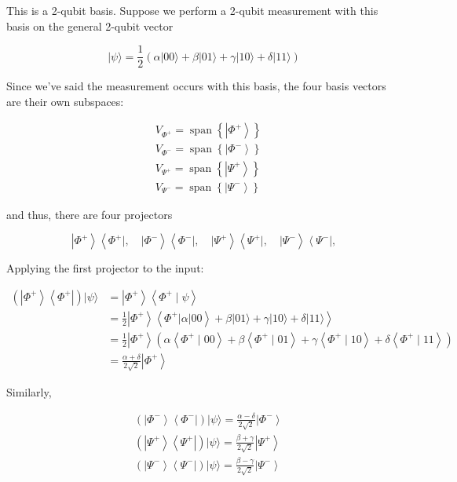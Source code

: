 \documentclass[main.tex]{subfiles}
\begin{document}
    This is a 2-qubit basis. Suppose we perform a 2-qubit measurement with this basis on the general 2-qubit vector
    
    $$
    |\psi\rangle=\frac{1}{2}(\alpha|00\rangle+\beta|01\rangle+\gamma|10\rangle+\delta|11\rangle)
    $$
    
    Since we've said the measurement occurs with this basis, the four basis vectors are their own subspaces:
    
    $$
    \begin{aligned}
    &V_{\Phi^{+}}=\operatorname{span}\left\{\left|\Phi^{+}\right\rangle\right\} \\
    &V_{\Phi^{-}}=\operatorname{span}\left\{\left|\Phi^{-}\right\rangle\right\} \\
    &V_{\Psi^{+}}=\operatorname{span}\left\{\left|\Psi^{+}\right\rangle\right\} \\
    &V_{\Psi^{-}}=\operatorname{span}\left\{\left|\Psi^{-}\right\rangle\right\}
    \end{aligned}
    $$
    
    and thus, there are four projectors
    
    $$
    \left|\Phi^{+}\right\rangle\left\langle\Phi^{+}|, \quad| \Phi^{-}\right\rangle\left\langle\Phi^{-}|, \quad| \Psi^{+}\right\rangle\left\langle\Psi^{+}|, \quad| \Psi^{-}\right\rangle\left\langle\Psi^{-}\right|,
    $$
    
    Applying the first projector to the input:
    
    $$
    \begin{aligned}
    \left(\left|\Phi^{+}\right\rangle\left\langle\Phi^{+}\right|\right)|\psi\rangle &=\left|\Phi^{+}\right\rangle\left\langle\Phi^{+} \mid \psi\right\rangle \\
    &\left.=\frac{1}{2}\left|\Phi^{+}\right\rangle\left\langle\Phi^{+}|\alpha| 00\right\rangle+\beta|01\rangle+\gamma|10\rangle+\delta|11\rangle\right\rangle \\
    &=\frac{1}{2}\left|\Phi^{+}\right\rangle\left(\alpha\left\langle\Phi^{+} \mid 00\right\rangle+\beta\left\langle\Phi^{+} \mid 01\right\rangle+\gamma\left\langle\Phi^{+} \mid 10\right\rangle+\delta\left\langle\Phi^{+} \mid 11\right\rangle\right) \\
    &=\frac{\alpha+\delta}{2 \sqrt{2}}\left|\Phi^{+}\right\rangle
    \end{aligned}
    $$
    
    Similarly,
    
    $$
    \begin{aligned}
    &\left(\left|\Phi^{-}\right\rangle\left\langle\Phi^{-}\right|\right)|\psi\rangle=\frac{\alpha-\delta}{2 \sqrt{2}}\left|\Phi^{-}\right\rangle \\
    &\left(\left|\Psi^{+}\right\rangle\left\langle\Psi^{+}\right|\right)|\psi\rangle=\frac{\beta+\gamma}{2 \sqrt{2}}\left|\Psi^{+}\right\rangle \\
    &\left(\left|\Psi^{-}\right\rangle\left\langle\Psi^{-}\right|\right)|\psi\rangle=\frac{\beta-\gamma}{2 \sqrt{2}}\left|\Psi^{-}\right\rangle
    \end{aligned}
    $$
    
\end{document}
